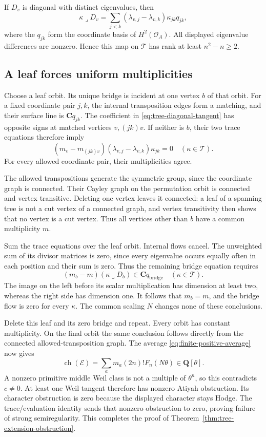 If $D_v$ is diagonal with distinct eigenvalues, then
\begin{equation}
 \kappa\lrcorner D_v
  =\sum_{j<k}(\lambda_{v,j}-\lambda_{v,k})
                      \kappa_{jk}q_{jk},
 \label{eq:tree-diagonal-tangent}
\end{equation}
where the $q_{jk}$ form the coordinate basis of $H^2(\mathcal O_A)$.
All displayed eigenvalue differences are nonzero.  Hence this map
on $\mathcal T$ has rank at least $n^2-n\ge2$.

\subsection{A leaf forces uniform multiplicities}

Choose a leaf orbit.  Its unique bridge is incident at one vertex
$b$ of that orbit.  For a fixed coordinate pair $j,k$, the internal
transposition edges form a matching, and their surface line is
$\mathbf Cq_{jk}$.  The coefficient in
\eqref{eq:tree-diagonal-tangent} has opposite signs at matched
vertices $v,(jk)v$.
If neither is $b$, their two trace equations therefore imply
\[
 (m_v-m_{(jk)v})(\lambda_{v,j}-\lambda_{v,k})\kappa_{jk}=0
                  \quad(\kappa\in\mathcal T).
\]
For every allowed coordinate pair, their multiplicities agree.

The allowed transpositions generate the symmetric group, since
the coordinate graph is connected.  Their Cayley graph on the
permutation orbit is connected and vertex transitive.  Deleting
one vertex leaves it connected: a leaf of a spanning tree is not
a cut vertex of a connected graph, and vertex transitivity then
shows that no vertex is a cut vertex.
Thus all vertices other than $b$ have a common multiplicity $m$.

Sum the trace equations over the leaf orbit.  Internal flows cancel.
The unweighted sum of its divisor matrices is zero, since every
eigenvalue occurs equally often in each position and their sum
is zero.  Thus the remaining bridge equation requires
\[
 (m_b-m)(\kappa\lrcorner D_b)\in\mathbf Cq_{\mathrm{bridge}}
                       \quad(\kappa\in\mathcal T).
\]
The image on the left before its scalar multiplication has
dimension at least two, whereas the right side has dimension one.
It follows that $m_b=m$, and the bridge flow is zero for every
$\kappa$.  The common scaling $N$ changes none of these conclusions.

Delete this leaf and its zero bridge and repeat.  Every orbit has
constant multiplicity.  On the final orbit the same conclusion
follows directly from the connected allowed-transposition graph.
The average \eqref{eq:finite-positive-average} now gives
\[
 \operatorname{ch}(\mathcal E)
  =\sum_a m_a(2n)!F_n(N\theta)\in\mathbf Q[\theta].
\]
A nonzero primitive middle Weil class is not a multiple of
$\theta^n$, so this contradicts $c\ne0$.
At least one Weil tangent therefore has nonzero Atiyah obstruction.
Its character obstruction is zero because the displayed character
stays Hodge.  The trace/evaluation identity sends that nonzero
obstruction to zero, proving failure of strong semiregularity.
This completes the proof of
Theorem~\ref{thm:tree-extension-obstruction}.

